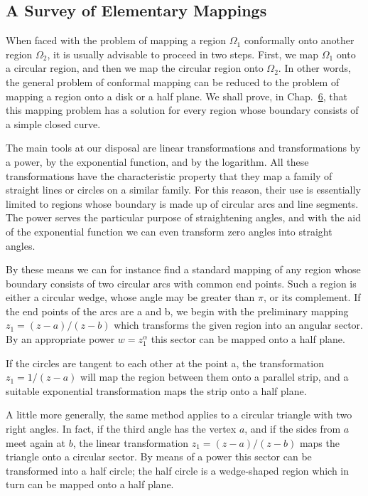 \setcounter{section}{4}\setcounter{subsection}{1}\subsection{A Survey of Elementary Mappings}\label{sec:3.4.2}
When faced with the problem of mapping a region $\Omega_{1}$ conformally onto another region $\Omega_{2}$, it is usually advisable to proceed in two steps. First, we map $\Omega_{1}$ onto a circular region, and then we map the circular region onto $\Omega_{2}$. In other words, the general problem of conformal mapping can be reduced to the problem of mapping a region onto a disk or a half plane. We shall prove, in Chap.~\hyperref[chap:6]{6}, that this mapping problem has a solution for every region whose boundary consists of a simple closed curve.

The main tools at our disposal are linear transformations and transformations by a power, by the exponential function, and by the logarithm. All these transformations have the characteristic property that they map a family of straight lines or circles on a similar family. For this reason, their use is essentially limited to regions whose boundary is made up of circular arcs and line segments. The power serves the particular purpose of straightening angles, and with the aid of the exponential function we can even transform zero angles into straight angles.

By these means we can for instance find a standard mapping of any
region whose boundary consists of two circular arcs with common end points. Such a region is either a circular wedge, whose angle may be greater than $\pi$, or its complement. If the end points of the arcs are a and b, we begin with the preliminary mapping $z_{1} = (z - a)/(z - b)$ which transforms the given region into an angular sector. By an appropriate power $w = z_{1}^{\alpha}$ this sector can be mapped onto a half plane.

If the circles are tangent to each other at the point a, the transformation $z_{1}=1/(z-a)$ will map the region between them onto a parallel strip, and a suitable exponential transformation maps the strip onto a half plane.

A little more generally, the same method applies to a circular triangle with two right angles. In fact, if the third angle has the vertex $a$, and if the sides from $a$ meet again at $b$, the linear transformation $z_{1} = (z - a)/(z - b)$ maps the triangle onto a circular sector. By means of a power this sector can be transformed into a half circle; the half circle is a wedge-shaped region which in turn can be mapped onto a half plane.

